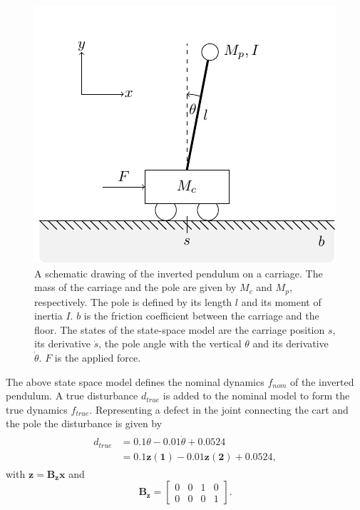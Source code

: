 \documentclass[letterpaper, 10 pt, conference]{ieeeconf}  %
\begin{document}
\begin{figure}
  \includegraphics[width=\linewidth]{tikz_inverted_pendulum.pdf}
  \caption{A schematic drawing of the inverted pendulum on a carriage. The mass of the carriage and the pole are given by $M_c$ and $M_p$, respectively. The pole is defined by its length $l$ and its moment of inertia $I$. $b$ is the friction coefficient between the carriage and the floor. The states of the state-space model are the carriage position $s$, its derivative $\dot{s}$, the pole angle with the vertical $\theta$ and its derivative $\dot{\theta}$. $F$ is the applied force. }
  \label{fig:inverted_pendulum}
\end{figure}
The above state space model defines the nominal dynamics $f_{nom}$ of the inverted pendulum. A true disturbance $d_{true}$ is added to the nominal model to form the true dynamics $f_{true}$. Representing a defect in the joint connecting the cart and the pole the disturbance is given by 
\begin{align}
\begin{split}
d_{true} &= 0.1 \theta -0.01 \dot{\theta} + 0.0524\\
&= 0.1 \boldsymbol{z(1)}-0.01 \boldsymbol{z(2)} + 0.0524,
\end{split}
\end{align}
with $\boldsymbol{z}=\boldsymbol{B_z} \boldsymbol{x}$ and 
\begin{equation}
    \boldsymbol{B_z}=
    \begin{bmatrix}
    0 & 0 & 1 & 0\\
    0 & 0 & 0 & 1
    \end{bmatrix}.
\end{equation}
\end{document}
